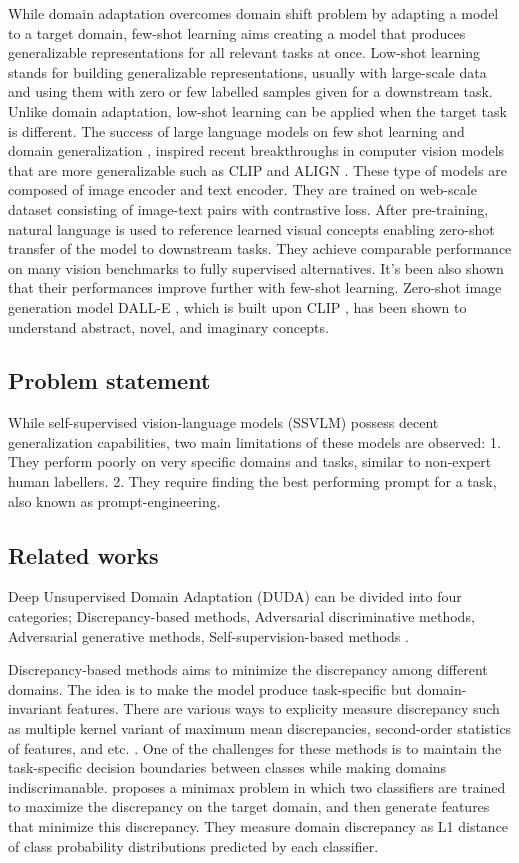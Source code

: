 \documentclass[conference]{IEEEtran}
\begin{document}
While domain adaptation overcomes domain shift problem by adapting a model to a target domain, few-shot learning aims creating a model that produces generalizable representations for all relevant tasks at once. Low-shot learning stands for building generalizable representations, usually with large-scale data and using them with zero or few labelled samples given for a downstream task. Unlike domain adaptation, low-shot learning can be applied when the target task is different. The success of large language models on few shot learning and domain generalization \cite{bert}, \cite{brown2020language} inspired recent breakthroughs in computer vision models that are more generalizable such as CLIP \cite{clip} and ALIGN \cite{align}. These type of models are composed of image encoder and text encoder. They are trained on web-scale dataset consisting of image-text pairs with contrastive loss. After pre-training, natural language is used to reference learned visual concepts enabling zero-shot transfer of the model to downstream tasks. They achieve comparable performance on many vision benchmarks to fully supervised alternatives. It's been also shown that their performances improve further with few-shot learning. Zero-shot image generation model DALL-E \cite{dalle}, which is built upon CLIP \cite{clip}, has been shown to understand abstract, novel, and imaginary concepts. 


\subsection{Problem statement}

While self-supervised vision-language models (SSVLM) possess decent generalization capabilities, two main limitations of these models are observed:
1. They perform poorly on very specific domains and tasks, similar to non-expert human labellers. 
2. They require finding the best performing prompt for a task, also known as prompt-engineering.


\subsection{Related works}
Deep Unsupervised Domain Adaptation (DUDA) can be divided into four categories; Discrepancy-based methods, Adversarial discriminative methods, Adversarial generative methods, Self-supervision-based methods \cite{Zhao2022}.

Discrepancy-based methods aims to minimize the discrepancy among different domains. The idea is to make the model produce task-specific but domain-invariant features. There are various ways to explicity measure discrepancy such as multiple kernel variant of maximum mean discrepancies, second-order statistics of features, and etc. \cite{Zhao2022}. One of the challenges for these methods is to maintain the task-specific decision boundaries between classes \cite{saito2018maximum} while making domains indiscrimanable. \cite{saito2018maximum} proposes a minimax problem in which two classifiers are trained to maximize the discrepancy on the target domain, and then generate features that minimize this discrepancy. They measure domain discrepancy as L1 distance of class probability distributions predicted by each classifier.
\end{document}
